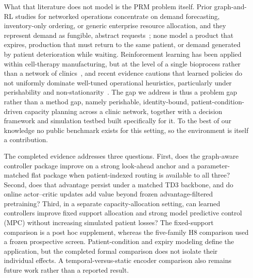 \documentclass[preprint,review,12pt]{elsarticle}
\begin{document}
What that literature does not model is the PRM problem itself. Prior graph-and-RL studies for networked operations concentrate on demand forecasting, inventory-only ordering, or generic enterprise resource allocation, and they represent demand as fungible, abstract requests~\cite{Kotecha2025GNNMARL, Ahn2024GSP, Mousa2023DecInvMARL, Bermudez2023DCPO, Eisenach2024NeuralCoordination}; none model a product that expires, production that must return to the same patient, or demand generated by patient deterioration while waiting. Reinforcement learning has been applied within cell-therapy manufacturing, but at the level of a single bioprocess rather than a network of clinics~\cite{Zheng2022HybridMBRL}, and recent evidence cautions that learned policies do not uniformly dominate well-tuned operational heuristics, particularly under perishability and non-stationarity~\cite{Stranieri2025PharmaDRL}. The gap we address is thus a problem gap rather than a method gap, namely perishable, identity-bound, patient-condition-driven capacity planning across a clinic network, together with a decision framework and simulation testbed built specifically for it. To the best of our knowledge no public benchmark exists for this setting, so the environment is itself a contribution.

The completed evidence addresses three questions. First, does the graph-aware
controller package improve on a strong look-ahead anchor and a parameter-matched
flat package when patient-indexed routing is available to all three? Second,
does that advantage persist under a matched TD3 backbone, and do online
actor--critic updates add value beyond frozen advantage-filtered pretraining?
Third, in a separate capacity-allocation setting, can learned controllers
improve fixed support allocation and strong model predictive control (MPC)
without increasing simulated patient losses? The fixed-support comparison is
a post hoc supplement, whereas the five-family H8 comparison used a frozen
prospective screen. Patient-condition and expiry modeling
define the application, but the completed formal comparison does not isolate
their individual effects. A temporal-versus-static encoder comparison also
remains future work rather than a reported result.
\end{document}
